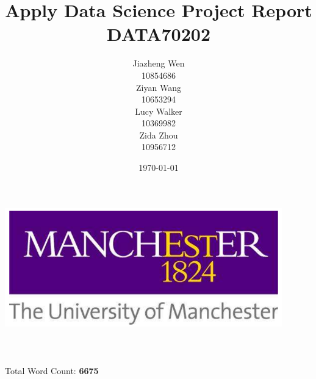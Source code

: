 \title{\Huge Apply Data Science Project Report \\[1cm]
        \bf\LARGE DATA70202 }
\author{\Large Jiazheng Wen\\ 10854686 \\[10pt]
                Ziyan Wang \\ 10653294 \\[10pt]
                Lucy Walker \\ 10369982 \\[10pt]
                Zida Zhou \\ 10956712 \\}
\date{\Large \today}

\makeatletter
    \begin{titlepage}
        \begin{center}
	        {\includegraphics[width=12cm]{Settings/TitlePicture.png}}
	   {\ \\}
        \vbox{}\vspace{3cm}
            {\@title }\\[1cm] 
            {\@author}\\[15pt]
            {\@date}\\[20pt]
            {\Large Total Word Count: \bf 6675 \\ \ \\}
        \end{center}
    \end{titlepage}
\makeatother
